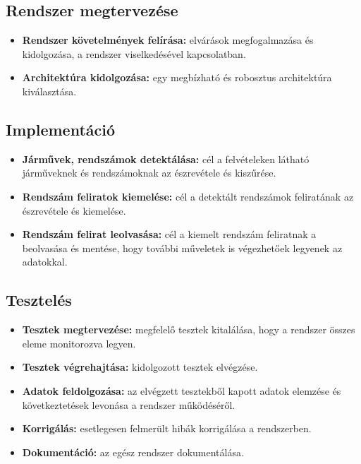 \documentclass[12pt,a4paper]{article}
\begin{document}
    \subsection{Rendszer megtervezése}
    \begin{itemize}
        \item \textbf{Rendszer követelmények felírása:} elvárások megfogalmazása és kidolgozása, a rendszer viselkedésével kapcsolatban.
        \item \textbf{Architektúra kidolgozása:} egy megbízható és robosztus architektúra kiválasztása.
    \end{itemize}
    
    
    \subsection{Implementáció}
    \begin{itemize}
        \item \textbf{Járművek, rendszámok detektálása:} cél a felvételeken látható járműveknek és rendszámoknak az észrevétele és kiszűrése.
        \item \textbf{Rendszám feliratok kiemelése:} cél a detektált rendszámok feliratának az észrevétele és kiemelése.
        \item \textbf{Rendszám felirat leolvasása:} cél a kiemelt rendszám feliratnak a beolvasása és mentése, hogy további műveletek is végezhetőek legyenek az adatokkal.
    \end{itemize}
    
    \subsection{Tesztelés}
    \begin{itemize}
        \item \textbf{Tesztek megtervezése:} megfelelő tesztek kitalálása, hogy a rendszer összes eleme monitorozva legyen.
        \item \textbf{Tesztek végrehajtása:} kidolgozott tesztek elvégzése.
        \item \textbf{Adatok feldolgozása:} az elvégzett tesztekből kapott adatok elemzése és következtetések levonása a rendszer működéséről.
        \item \textbf{Korrigálás:} esetlegesen felmerült hibák korrigálása a rendszerben.
        \item \textbf{Dokumentáció:} az egész rendszer dokumentálása.
    \end{itemize}
    
\end{document}
